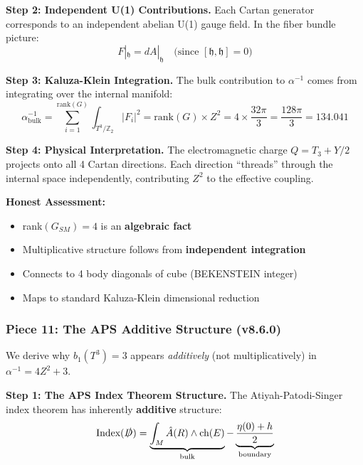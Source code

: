 \documentclass[12pt,a4paper]{article}
\newcommand{\Ztwo}{\mathbb{Z}_2}
\newcommand{\Tthree}{T^3}
\newcommand{\Zsq}{Z^2}
\begin{document}
\textbf{Step 2: Independent U(1) Contributions.}
Each Cartan generator corresponds to an independent abelian U(1) gauge field. In the fiber bundle picture:
\begin{equation}
F|_{\mathfrak{h}} = dA|_{\mathfrak{h}} \quad \text{(since } [\mathfrak{h}, \mathfrak{h}] = 0 \text{)}
\end{equation}

\textbf{Step 3: Kaluza-Klein Integration.}
The bulk contribution to $\alpha^{-1}$ comes from integrating over the internal manifold:
\begin{equation}
\alpha^{-1}_{\text{bulk}} = \sum_{i=1}^{\text{rank}(G)} \int_{\Tthree/\Ztwo} |F_i|^2 = \text{rank}(G) \times \Zsq = 4 \times \frac{32\pi}{3} = \frac{128\pi}{3} = 134.041
\end{equation}

\textbf{Step 4: Physical Interpretation.}
The electromagnetic charge $Q = T_3 + Y/2$ projects onto all 4 Cartan directions. Each direction ``threads'' through the internal space independently, contributing $\Zsq$ to the effective coupling.

\textbf{Honest Assessment:}
\begin{itemize}[itemsep=0pt]
    \item[\checkmark] rank$(G_{SM}) = 4$ is an \textbf{algebraic fact}
    \item[\checkmark] Multiplicative structure follows from \textbf{independent integration}
    \item[\checkmark] Connects to 4 body diagonals of cube (BEKENSTEIN integer)
    \item[\checkmark] Maps to standard Kaluza-Klein dimensional reduction
\end{itemize}

\subsubsection{Piece 11: The APS Additive Structure (v8.6.0)}

We derive why $b_1(T^3) = 3$ appears \textit{additively} (not multiplicatively) in $\alpha^{-1} = 4\Zsq + 3$.

\textbf{Step 1: The APS Index Theorem Structure.}
The Atiyah-Patodi-Singer index theorem has inherently \textbf{additive} structure:
\begin{equation}
\text{Index}(\slashed{D}) = \underbrace{\int_M \hat{A}(R) \wedge \text{ch}(E)}_{\text{bulk}} - \underbrace{\frac{\eta(0) + h}{2}}_{\text{boundary}}
\end{equation}
\end{document}

